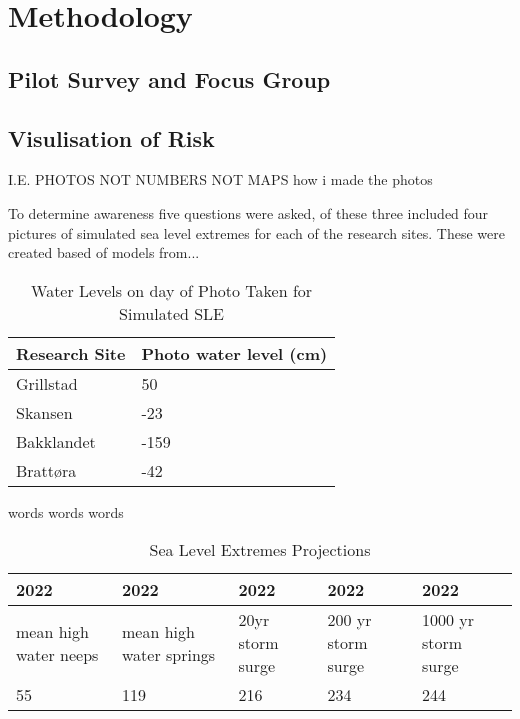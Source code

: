 


\chapter{Methodology}
\section{Pilot Survey and Focus Group}

\section{Visulisation of Risk}
I.E. PHOTOS NOT NUMBERS NOT MAPS 
how i made the photos

To determine awareness five questions were asked, of these three included four pictures of simulated sea level extremes for each of the research sites. These were created based of models from...



\begin{table}[h]
    \centering
    \begin{tabular}{|l|l|}
        \hline
     	Research Site & Photo water level (cm) \\ \hline
            Grillstad & 50 \\ \hline
            Skansen & -23 \\ \hline
            Bakklandet & -159 \\ \hline
            Brattøra	& -42 \\ \hline
    \end{tabular}
    \caption{Water Levels on day of Photo Taken for Simulated SLE}
    \label{tab:water_level_photo}
\end{table}


words words words

\begin{table}[h]
    \centering
    \begin{tabular}{|l|l|l|l|l|}
    \hline
        2022 & 2022 & 2022 & 2022 & 2022 \\ \hline
        mean high water neeps & mean high water springs & 20yr storm surge  & 200 yr storm surge  & 1000 yr storm surge  \\ \hline
        55 & 119 & 216 & 234 & 244 \\ \hline
    \end{tabular}
    \caption{Sea Level Extremes Projections}
    \label{2022_sle_projections}
\end{table}

